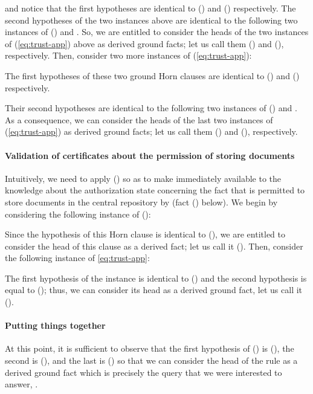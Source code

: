 \documentclass[conference]{llncs}
\begin{document}
{\begin{small}

\end{small}

\noindent 
and notice that the first hypotheses are identical to () and ()
respectively.  The second hypotheses of the two instances above are
identical to the following two instances of ()  and 
.  
So, we are entitled to consider the heads of the two instances of
(\ref{eq:trust-app}) above as derived ground facts; let us call them
() and (), respectively.  Then, consider two more instances of
(\ref{eq:trust-app}):


The first hypotheses of these two ground Horn clauses are identical to
() and () respectively. 

Their second hypotheses are
identical to the following two instances of ()  and
.
As a consequence, we can consider the heads of the last two instances
of (\ref{eq:trust-app}) as derived ground facts; let us call them 
() and (), respectively. 

\paragraph{Validation of certificates about the permission of storing
  documents}  Intuitively, we need to apply () so as to make
immediately available to  the knowledge about the authorization
state concerning the fact that  is permitted to store documents
in the central repository by  (fact () below).
We begin by considering the following instance of ():

\begin{small}

\end{small}

\noindent
Since the hypothesis of this Horn clause is identical to (), we are
entitled to consider the head of this clause as a derived fact; let us
call it ().  Then, consider the following instance of
\eqref{eq:trust-app}:

\begin{small}

\end{small}

\noindent
The first hypothesis of the instance is identical to () and the
second hypothesis is equal to (); thus, we can consider its head as
a derived ground fact, let us call it ().

\paragraph{Putting things together}  At this point, it is sufficient to
observe that the first hypothesis of () is (), the second is (),
and the last is () so that we can consider the head of the rule as a
derived ground fact which is precisely the query that we were
interested to answer, .\\

}
\end{document}
